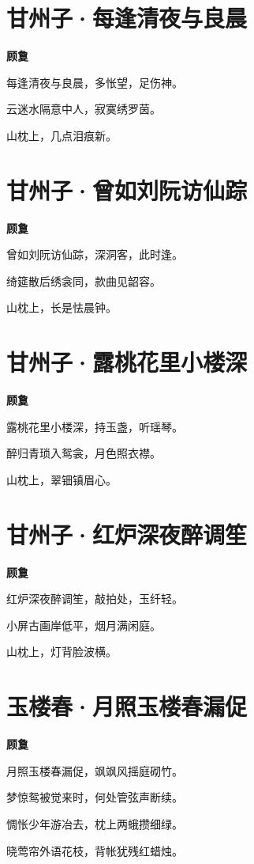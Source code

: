 \documentclass[12pt,a4paper]{ctexbook}
\begin{document}
\section{甘州子·每逢清夜与良晨}
\textbf{顾敻}\par\vspace{0.5em}
每逢清夜与良晨，多怅望，足伤神。\par
云迷水隔意中人，寂寞绣罗茵。\par
山枕上，几点泪痕新。\par

\section{甘州子·曾如刘阮访仙踪}
\textbf{顾敻}\par\vspace{0.5em}
曾如刘阮访仙踪，深洞客，此时逢。\par
绮筵散后绣衾同，款曲见韶容。\par
山枕上，长是怯晨钟。\par

\section{甘州子·露桃花里小楼深}
\textbf{顾敻}\par\vspace{0.5em}
露桃花里小楼深，持玉盏，听瑶琴。\par
醉归青琐入鸳衾，月色照衣襟。\par
山枕上，翠钿镇眉心。\par

\section{甘州子·红炉深夜醉调笙}
\textbf{顾敻}\par\vspace{0.5em}
红炉深夜醉调笙，敲拍处，玉纤轻。\par
小屏古画岸低平，烟月满闲庭。\par
山枕上，灯背脸波横。\par

\section{玉楼春·月照玉楼春漏促}
\textbf{顾敻}\par\vspace{0.5em}
月照玉楼春漏促，飒飒风摇庭砌竹。\par
梦惊鸳被觉来时，何处管弦声断续。\par
惆怅少年游冶去，枕上两蛾攒细绿。\par
晓莺帘外语花枝，背帐犹残红蜡烛。\par
\end{document}
